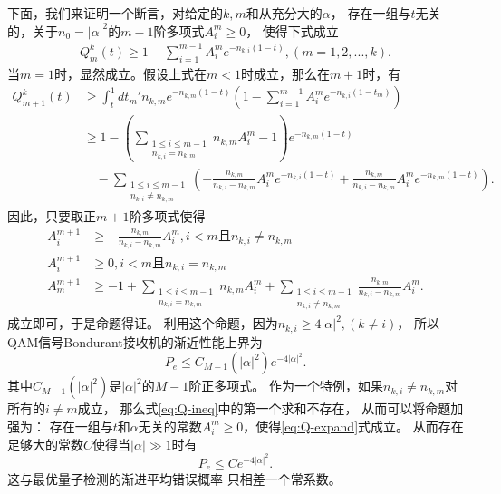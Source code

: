下面，我们来证明一个断言，对给定的$k,m$和从充分大的$\alpha$，
存在一组与$t$无关的，关于$n_0 = |\alpha|^2$的$m-1$阶多项式$A_i^m \ge 0$，
使得下式成立
\begin{equation}
\begin{split}
Q_m^k(t) \ge 1 - \sum_{i=1}^{m-1} A_i^m e^{-n_{k,i}(1-t)}, (m=1,2,...,k).
\end{split}
\label{eq:Q-expand}
\end{equation}
当$m=1$时，显然成立。假设上式在$m<1$时成立，那么在$m+1$时，有
\begin{equation}
\begin{split}
Q_{m+1}^k(t) &\ge \int_t^1  dt_{m}' n_{k,m} e^{-n_{k,m}(1-t)} (1 - \sum_{i=1}^{m-1} A_i^m e^{-n_{k,i}(1-t_m)} ) \\
             &\ge 1 - \left( \sum_{\substack{1\le i \le m-1 \\
                n_{k,i} = n_{k,m}} }  n_{k,m}A_i^{m} -1\right) e^{-n_{k,m}(1-t)}  \\
             & \quad - \sum_{\substack{1\le i \le m-1 \\
                n_{k,i} \neq n_{k,m}}} \left(-\frac{n_{k,m}}{n_{k,i} - n_{k,m}} A_i^m e^{-n_{k,i}(1-t)}  + \frac{n_{k,m}}{n_{k,i} - n_{k,m}} A_i^m e^{-n_{k,m}(1-t)}    \right) .
\end{split}
\label{eq:Q-ineq}
\end{equation}
因此，只要取正$m+1$阶多项式使得
\begin{equation}
\begin{split}
A_i^{m+1} &\ge -\frac{n_{k,m}}{n_{k,i} - n_{k,m}} A_i^m , i<m \text{且} n_{k,i} \neq n_{k,m}\\
A_i^{m+1} &\ge 0 , i<m \text{且} n_{k,i} = n_{k,m}\\
A_m^{m+1} &\ge -1 + \sum_{\substack{1\le i \le m-1 \\
                n_{k,i} = n_{k,m}} }  n_{k,m}A_i^{m} + \sum_{\substack{1\le i \le m-1 \\
                n_{k,i} \neq n_{k,m}}} \frac{n_{k,m}}{n_{k,i} - n_{k,m}} A_i^m .
\end{split}
\end{equation}
成立即可，于是命题得证。
利用这个命题，因为$n_{k,i} \ge 4|\alpha|^2,(k \neq i)$，
所以QAM信号Bondurant接收机的渐近性能上界为
\begin{equation}
P_e \le C_{M-1}(|\alpha|^2) e^{-4|\alpha|^2}.
\label{eq:QAM-Bondurant-approx-err}
\end{equation}
其中$C_{M-1}(|\alpha|^2)$是$|\alpha|^2$的$M-1$阶正多项式。
作为一个特例，如果$n_{k,i} \neq n_{k,m}$对所有的$i\neq m$成立，
那么式\ref{eq:Q-ineq}中的第一个求和不存在，
从而可以将命题加强为：
存在一组与$t$和$\alpha$无关的常数$A_i^m \ge 0$，使得\ref{eq:Q-expand}式成立。
从而存在足够大的常数$C$使得当$|\alpha| \gg 1$时有
\begin{equation}
P_e \le C e^{-4|\alpha|^2}.
\label{eq:QAM-Bondurant-approx-err-2}
\end{equation}
这与最优量子检测的渐进平均错误概率
只相差一个常系数。


